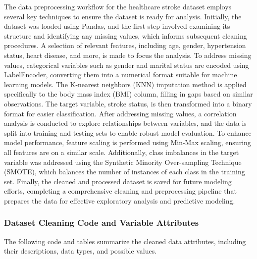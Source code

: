 \documentclass[runningheads]{llncs}
\begin{document}
\begin{enumerate}
The data preprocessing workflow for the healthcare stroke dataset employs several key techniques to ensure the dataset is ready for analysis. Initially, the dataset was loaded using Pandas, and the first step involved examining its structure and identifying any missing values, which informs subsequent cleaning procedures. A selection of relevant features, including age, gender, hypertension status, heart disease, and more, is made to focus the analysis. To address missing values, categorical variables such as gender and marital status are encoded using LabelEncoder, converting them into a numerical format suitable for machine learning models. The K-nearest neighbors (KNN) imputation method is applied specifically to the body mass index (BMI) column, filling in gaps based on similar observations. The target variable, stroke status, is then transformed into a binary format for easier classification. After addressing missing values, a correlation analysis is conducted to explore relationships between variables, and the data is split into training and testing sets to enable robust model evaluation. To enhance model performance, feature scaling is performed using Min-Max scaling, ensuring all features are on a similar scale. Additionally, class imbalances in the target variable was addressed using the Synthetic Minority Over-sampling Technique (SMOTE), which balances the number of instances of each class in the training set. Finally, the cleaned and processed dataset is saved for future modeling efforts, completing a comprehensive cleaning and preprocessing pipeline that prepares the data for effective exploratory analysis and predictive modeling.

\subsubsection{Dataset Cleaning Code and Variable Attributes}

The following code and tables summarize the cleaned data attributes, including their descriptions, data types, and possible values.


\end{enumerate}
\end{document}
